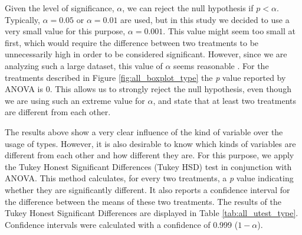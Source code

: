 \documentclass[]{sigplanconf}
\begin{document}
Given the level of significance, $\alpha$, we can reject the null hypothesis if $p < \alpha$.
Typically, $\alpha=0.05$ or $\alpha=0.01$ are used, but in this study  we decided to use a very small value for this purpose, $\alpha=0.001$.
This value might seem too small at first, which would require the difference between two treatments to be unnecessarily high in order to be considered significant.
However, since we are analyzing such a large dataset, this value of $\alpha$ seems reasonable \cite{labovitz68}.
For the treatments described in Figure \ref{fig:all_boxplot_type} the \emph{p} value reported by ANOVA is 0. 
This allows us to strongly reject the null hypothesis, even though we are using such an extreme value for $\alpha$, and state that at least two treatments are different from each other.


The results above show a very clear influence of the kind of variable over the usage of types.
However, it is also desirable to know which kinds of variables are different from each other and how different they are.
For this purpose, we apply the Tukey Honest Significant Differences (Tukey HSD) test in conjunction with ANOVA.
This method calculates, for every two treatments, a \emph{p} value indicating whether they are significantly different.
It also reports a confidence interval for the difference between the means of these two treatments.
The results of the Tukey Honest Significant Differences are displayed in Table \ref{tab:all_utest_type}.
Confidence intervals were calculated with a confidence of 0.999 ($1-\alpha$).


\end{document}
